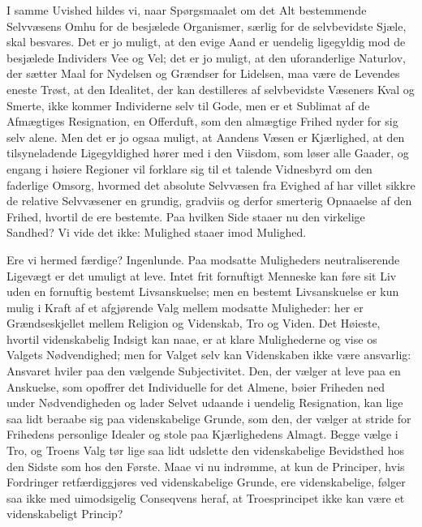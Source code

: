 \documentclass[12pt]{article}
\newcommand{\opage}[1]{\marginnote{\footnotesize\textit{[#1]}}}
\begin{document}
I samme Uvished hildes vi, naar Spørgsmaalet om det Alt bestemmende
Selvvæsens Omhu for de besjælede Organismer, særlig for de selvbevidste
Sjæle, skal besvares. Det er jo muligt, at den evige Aand er uendelig
ligegyldig mod de besjælede Individers Vee og Vel; det er jo muligt, at
den uforanderlige Naturlov, der sætter Maal for Nydelsen og Grændser
for Lidelsen, maa være de Levendes eneste Trøst, at den Idealitet, der
kan destilleres af selvbevidste Væseners Kval og Smerte, ikke kommer
Individerne selv til Gode, men er et Sublimat af de Afmægtiges
Resignation, en Offerduft, som den almægtige Frihed nyder for sig selv
alene. Men det er jo ogsaa muligt, at Aandens Væsen er Kjærlighed, at
den tilsyneladende Ligegyldighed hører med i den Viisdom, som løser
alle Gaader, og engang i høiere Regioner vil forklare sig til et talende
Vidnesbyrd om den faderlige Omsorg, hvormed det absolute Selvvæsen fra
Evighed af har villet sikkre de relative Selvvæsener en grundig,
gradviis og derfor smerterig Opnaaelse af den Frihed, hvortil de ere
bestemte. Paa hvilken Side staaer nu den virkelige Sandhed? Vi vide det
ikke: Mulighed staaer imod Mulighed.

Ere vi hermed færdige? Ingenlunde. Paa modsatte Muligheders
neutraliserende Ligevægt er det umuligt at leve. Intet frit fornuftigt
Menneske kan føre sit Liv uden en fornuftig bestemt Livsanskuelse; men
en bestemt Livsanskuelse er kun mulig i Kraft af et afgjørende Valg
mellem modsatte Muligheder: her er Grændseskjellet mellem Religion og
Videnskab, Tro og
\opage{71} Viden. Det Høieste, hvortil videnskabelig Indsigt kan naae, er at klare
Mulighederne og vise os Valgets Nødvendighed; men for Valget selv kan
Videnskaben ikke være ansvarlig: Ansvaret hviler paa den vælgende
Subjectivitet. Den, der vælger at leve paa en Anskuelse, som opoffrer
det Individuelle for det Almene, bøier Friheden ned under Nødvendigheden
og lader Selvet udaande i uendelig Resignation, kan lige saa lidt
beraabe sig paa videnskabelige Grunde, som den, der vælger at stride
for Frihedens personlige Idealer og stole paa Kjærlighedens Almagt.
Begge vælge i Tro, og Troens Valg tør lige saa lidt udslette den
videnskabelige Bevidsthed hos den Sidste som hos den Første. Maae vi nu
indrømme, at kun de Principer, hvis Fordringer retfærdiggjøres ved
videnskabelige Grunde, ere videnskabelige, følger saa ikke med
uimodsigelig Conseqvens heraf, at Troesprincipet ikke kan være et
videnskabeligt Princip?
\end{document}
